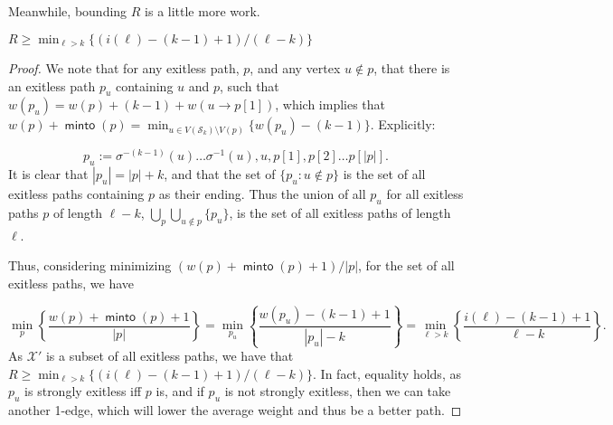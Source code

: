 \documentclass{article}
\DeclareMathOperator{\minto}{\bm{\mathsf{minto}}}
\newcommand{\edit}[1]{}%
\newcommand{\dc}[1]{}%
\begin{document}
\dc{ I would also suggest changing ``strongly exitless path'' to ``complete exitless path,'' since ``strongly'' is an adverb but isn't actually modifying the ``exitless'' part, so you should use an adjective instead. If you decide to change it, define ``complete'' entirely separately from ``exitless.'' This also saves you some words since often the distinction is just between exitless and strongly exitless, so you could say something like ``if it is also complete ...''}

\vspace{.75em}
Meanwhile, bounding $R$ is a little more work.
\begin{red} $R \geq \min_{\ell > k}\{(i(\ell)-(k-1)+1)/(\ell-k) \}$
\begin{proof}

We note that for any exitless path, $p$, and any vertex $u \not \in p$, that there is an exitless path $p_u$ containing $u$ and $p$, such that $w(p_u) = w(p) + (k-1)+w(u\to p[1])$, which implies that $w(p)+\minto(p) = \min_{u \in V(\mathcal{S}_k) \setminus V(p)}\{w(p_u)-(k-1)\}$. Explicitly: 

\[p_u := \sigma^{-(k-1)}(u)\dots \sigma^{-1}(u), u, p[1],p[2]\dots p[|p|].\]
It is clear that $|p_u| = |p|+k$, and that the set of $\{p_u: u \not \in p\}$ is the set of all exitless paths containing $p$ as their ending. Thus the union of all $p_u$ for all exitless paths $p$ of length $\ell-k$\dc{ and choice of $u$}, $\bigcup_p \bigcup_{u\not \in p} \{p_u\}$\dc{ don't need to write this in notation}, is the set of all exitless paths of length $\ell$.

Thus, considering minimizing $(w(p)+\minto(p)+1)/|p|$, for the set of all exitless paths, we have

\[\min_p\left\{\frac{w(p)+\minto(p)+1}{|p|}\right\} = \min_{p_u}\left\{\frac{w(p_u)-(k-1)+1}{|p_u|-k}\right\} = \min_{\ell > k}\left\{\frac{i(\ell)-(k-1)+1}{\ell-k} \right\}.\]
As $\mathcal{X}'$ is a subset of all exitless paths, we have that $R \geq \min_{\ell > k}\{(i(\ell)-(k-1)+1)/(\ell-k) \}$. In fact, equality holds, as $p_u$ is strongly exitless iff $p$ is, and if $p_u$ is not strongly exitless, then we can take another 1-edge, which will lower the average weight and thus be a better path. \edit{ explain average weight a little more}
\end{proof}
\end{red}
\end{document}
